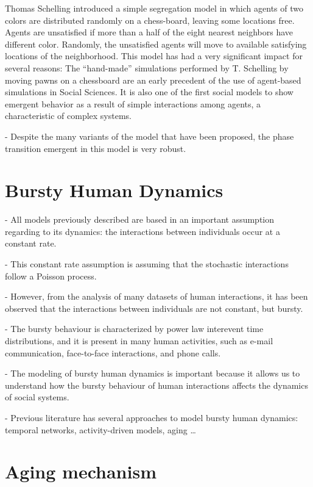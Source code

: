 Thomas Schelling introduced a simple segregation model   \cite{schelling-1969,Schelling,schellingbook,hegselmann-2017} in which agents of two colors are distributed randomly on a chess-board, leaving some locations free. Agents are unsatisfied if more than a half of the eight nearest neighbors have different color. Randomly, the unsatisfied agents will move to available satisfying locations of the neighborhood. This model has had a very significant impact for several reasons: The ``hand-made'' simulations performed by T. Schelling by moving pawns on a chessboard are an early precedent of the use of  agent-based simulations in Social Sciences. It is also one of the first social models to show emergent behavior as a result of simple interactions among agents, a characteristic of complex systems.

- Despite the many variants of the model that have been proposed, the phase transition emergent in this model is very robust.

\section{\label{sec: Bursty Human Dynamics} Bursty Human Dynamics}

- All models previously described are based in an important assumption regarding to its dynamics: the interactions between individuals occur at a constant rate.

- This constant rate assumption is assuming that the stochastic interactions follow a Poisson process. 

- However, from the analysis of many datasets of human interactions, it has been observed that the interactions between individuals are not constant, but bursty.

- The bursty behaviour is characterized by power law interevent time distributions, and it is present in many human activities, such as e-mail communication, face-to-face interactions, and phone calls.

- The modeling of bursty human dynamics is important because it allows us to understand how the bursty behaviour of human interactions affects the dynamics of social systems.

- Previous literature has several approaches to model bursty human dynamics: temporal networks, activity-driven models, aging \dots

\section{\label{sec:Aging mechanism} Aging mechanism}

